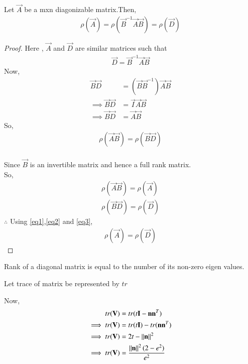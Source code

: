 \documentclass[journal,12pt,twocolumn]{IEEEtran}
\begin{document}
\begin{lemma}
\label{lemma1}
Let $\vec{A}$ be a mxn diagonizable matrix.Then,
\begin{align}
   \rho(\vec{A}) = \rho(\vec{B}^{-1}\vec{A}\vec{B}) = \rho(\vec{D}) \label{eqq1}
\end{align}
\end{lemma}

\begin{proof}
Here , $\vec{A}$ and $\vec{D}$ are similar matrices such that 
\begin{align}
    \vec{D} = \vec{B}^{-1}\vec{A}\vec{B}
\end{align}
Now,
\begin{align}
    \vec{B}\vec{D} &= (\vec{B}\vec{B}^{-1})\vec{A}\vec{B}
    \\
    \implies \vec{B}\vec{D} &= \vec{I}\vec{A}\vec{B}
    \\
    \implies \vec{B}\vec{D} &= \vec{A}\vec{B}
\end{align}
So,
\begin{align}
    \rho(\vec{A}\vec{B}) = \rho(\vec{B}\vec{D}) \label{eq1}
\end{align}
\\
Since $\vec{B}$ is an invertible matrix and hence a full rank matrix.
\\
So,
\begin{align}
    \rho(\vec{A}\vec{B}) = \rho(\vec{A}) \label{eq2}
    \\
    \rho(\vec{B}\vec{D}) = \rho(\vec{D}) \label{eq3}
\end{align}
$\therefore$ Using \eqref{eq1},\eqref{eq2} and \eqref{eq3},
\begin{align}
    \rho(\vec{A}) = \rho(\vec{D})
\end{align}
\end{proof}

\begin{definition}
Rank of a diagonal matrix is equal to the number of its non-zero eigen values. \label{def1}
\end{definition}

Let trace of matrix be represented by $tr$

Now,
\begin{align}
    tr(\mathbf{V}) &= tr(t\mathbf{I}-\mathbf{n}\mathbf{n}^T)
    \\
    \implies tr(\mathbf{V}) &= tr(t\mathbf{I}) - tr(\mathbf{n}\mathbf{n}^T)
    \\
    \implies tr(\mathbf{V}) &= 2t - \left\lVert\mathbf{n}\right\rVert^2
    \\
    \implies tr(\mathbf{V}) &= \frac{\left\lVert\mathbf{n}\right\rVert^2(2-e^2)}{e^2} \label{trace}
\end{align}
\end{document}
